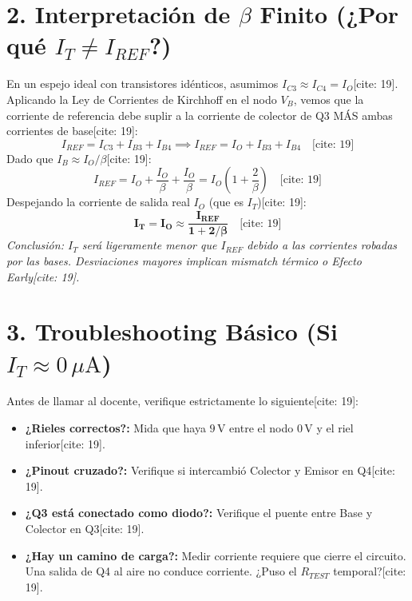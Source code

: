\documentclass[11pt, a4paper]{article}
\begin{document}
\section*{2. Interpretación de $\beta$ Finito (¿Por qué $I_T \neq I_{REF}$?)}
En un espejo ideal con transistores idénticos, asumimos $I_{C3} \approx I_{C4} = I_O$[cite: 19]. 
Aplicando la Ley de Corrientes de Kirchhoff en el nodo $V_B$, vemos que la corriente de referencia debe suplir a la corriente de colector de Q3 MÁS ambas corrientes de base[cite: 19]:
\begin{equation*}
    I_{REF} = I_{C3} + I_{B3} + I_{B4} \implies I_{REF} = I_O + I_{B3} + I_{B4} \quad \text{[cite: 19]}
\end{equation*}
Dado que $I_B \approx I_O / \beta$[cite: 19]:
\begin{equation*}
    I_{REF} = I_O + \frac{I_O}{\beta} + \frac{I_O}{\beta} = I_O \left(1 + \frac{2}{\beta}\right) \quad \text{[cite: 19]}
\end{equation*}
Despejando la corriente de salida real $I_O$ (que es $I_T$)[cite: 19]:
\begin{equation*}
    \boxed{\mathbf{ I_T = I_O \approx \frac{I_{REF}}{1 + 2/\beta} }} \quad \text{[cite: 19]}
\end{equation*}
\textit{Conclusión: $I_T$ será ligeramente menor que $I_{REF}$ debido a las corrientes robadas por las bases. Desviaciones mayores implican mismatch térmico o Efecto Early[cite: 19].}

\section*{3. Troubleshooting Básico (Si $I_T \approx 0\,\mu\text{A}$)}
Antes de llamar al docente, verifique estrictamente lo siguiente[cite: 19]:
\begin{itemize}
    \item \textbf{¿Rieles correctos?:} Mida que haya $9\,\text{V}$ entre el nodo $0\,\text{V}$ y el riel inferior[cite: 19].
    \item \textbf{¿Pinout cruzado?:} Verifique si intercambió Colector y Emisor en Q4[cite: 19].
    \item \textbf{¿Q3 está conectado como diodo?:} Verifique el puente entre Base y Colector en Q3[cite: 19].
    \item \textbf{¿Hay un camino de carga?:} Medir corriente requiere que cierre el circuito. Una salida de Q4 al aire no conduce corriente. ¿Puso el $R_{TEST}$ temporal?[cite: 19].
\end{itemize}
\end{document}
